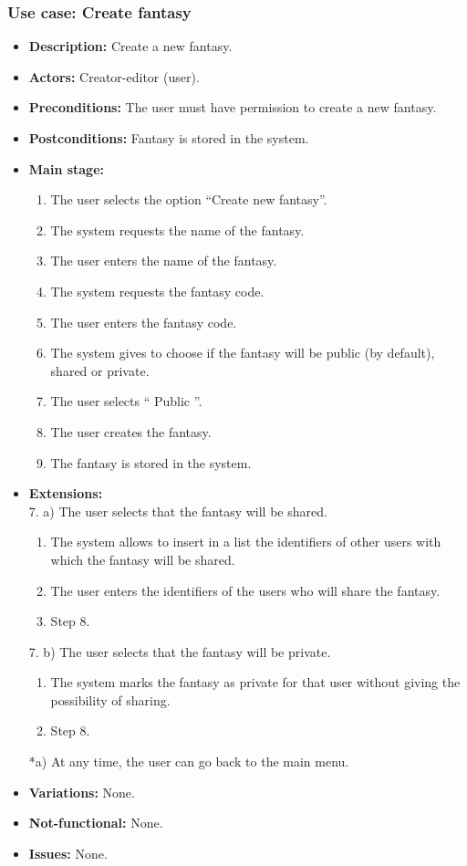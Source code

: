 \subsubsection{Use case: Create fantasy}
\begin{itemize}
	\item \textbf{Description:} Create a new fantasy.
	\item \textbf{Actors:} Creator-editor (user).
	\item \textbf{Preconditions:} The user must have permission to create a new fantasy.
	\item \textbf{Postconditions:} Fantasy is stored in the system.
	\item \textbf{Main stage:}
	\begin{enumerate}
		\item The user selects the option ``Create new fantasy''.
		\item The system requests the name of the fantasy.
		\item The user enters the name of the fantasy.
		\item The system requests the fantasy code.
		\item The user enters the fantasy code.
		\item The system gives to choose if the fantasy will be public (by default), shared or private.
		\item The user selects `` Public ''.
		\item The user creates the fantasy.
		\item The fantasy is stored in the system.
	\end{enumerate}
	\item \textbf{Extensions:} \\7. a) The user selects that the fantasy will be shared.
	\begin{enumerate}
		\item The system allows to insert in a list the identifiers of other users with which the fantasy will be shared.
		\item The user enters the identifiers of the users who will share the fantasy.
		\item Step 8.
	\end{enumerate}
	7. b) The user selects that the fantasy will be private.
	\begin{enumerate}
		\item The system marks the fantasy as private for that user without giving the possibility of sharing.
		\item Step 8.
	\end{enumerate}
	*a) At any time, the user can go back to the main menu.
	\item \textbf{Variations:} None.
	\item \textbf{Not-functional:} None.
	\item \textbf{Issues:} None.
\end{itemize}

